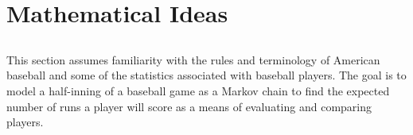 \documentclass[12pt]{article}
\begin{document}
\section*{Mathematical Ideas}
\subsection*{}

This section assumes familiarity with the rules and terminology of
American baseball%
and some of the statistics associated with baseball players.  The goal
is to model a half-inning of a baseball game as a Markov chain to find
the expected number of runs a player will score as a means of evaluating
and comparing players.
\end{document}
